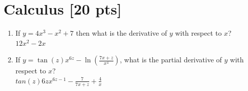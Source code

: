 \documentclass[a4paper]{article}
\theoremstyle{definition}
\newenvironment{soln}{
    \leavevmode\color{blue}\ignorespaces
}{}
\begin{document}
\section{Calculus [20 pts]}
\begin{enumerate}
	\item 	If $y = 4x^3 - x^2 + 7$ then what is the derivative of $y$ with respect to $x$?\\
	 \begin{soln}$12x^2 - 2x$\end{soln}
	\item If $y = \tan(z)x^{6z} - \ln(\frac{7x + z}{x^{4}})$, what is the partial derivative of $y$ with respect to $x$?\\
	 \begin{soln}$tan(z)6zx^{6z-1}-\frac{7}{7x+z}+\frac{4}{x}$\end{soln}
\end{enumerate}
\end{document}
